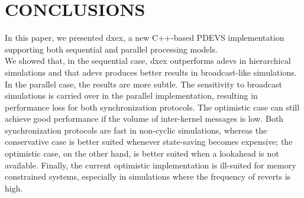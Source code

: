\section{CONCLUSIONS}
In this paper, we presented dxex, a new C++-based PDEVS implementation supporting both sequential and parallel processing models.\\
We showed that, in the sequential case, dxex outperforms adevs in hierarchical simulations and that adevs produces better results in broadcast-like simulations.\\
In the parallel case, the results are more subtle. The sensitivity to broadcast simulations is carried over in the parallel implementation, resulting in performance loss for both synchronization protocols. The optimistic case can still achieve good performance if the volume of inter-kernel messages is low. Both synchronization protocols are fast in non-cyclic simulations, whereas the conservative case is better suited whenever state-saving becomes expensive; the optimistic case, on the other hand, is better suited when a lookahead is not available.
Finally, the current optimistic implementation is ill-suited for memory constrained systems, especially in simulations where the frequency of reverts is high.
